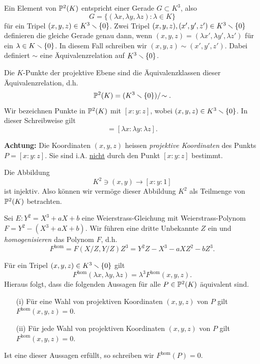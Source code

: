 \begin{bemerkung}
  Ein Element von ${\mathbb{P}}^2(K)$ entspricht einer Gerade $G\subset K^3$,
  also
  $$ G = \{ (\lambda x,\lambda y,\lambda z) : \lambda\in K\}$$
  für ein Tripel $(x,y,z)\in K^3\smallsetminus\{0\}$. Zwei Tripel
  $(x,y,z),(x',y',z')\in K^3\smallsetminus\{0\}$ definieren die gleiche Gerade
  genau dann, wenn
  $(x,y,z)=(\lambda x',\lambda y',\lambda z')$ für ein $\lambda\in
  K\smallsetminus\{0\}$.
  In diesem Fall schreiben wir $(x,y,z)\sim (x',y',z')$. Dabei
  definiert $\sim$ eine Äquivalenzrelation auf $K^3\smallsetminus\{0\}$.

  Die $K$-Punkte der projektive Ebene sind die Äquivalenzklassen dieser
  Äquivalenzrelation, d.h. 
  \begin{equation*}
    {\mathbb{P}}^2(K) = (K^3\smallsetminus\{0\})/\!\sim.
  \end{equation*}
  Wir bezeichnen Punkte in ${\mathbb{P}}^2(K)$ mit $[x:y:z]$, wobei $(x,y,z)\in
  K^3\smallsetminus\{0\}$. In dieser Schreibweise gilt
  \begin{equation*}
    [x:y:z] = [\lambda x : \lambda y : \lambda z]. 
  \end{equation*}

  \textbf{Achtung:} Die Koordinaten $(x,y,z)$ heissen \emph{projektive
    Koordinaten} des Punkts $P=[x:y:z]$. Sie sind i.A.
  \underline{nicht} durch den Punkt $[x:y:z]$ bestimmt.

  Die Abbildung
  \begin{equation}
    \label{eq:affinechart}
    K^2\ni (x,y)\rightarrow [x:y:1] 
  \end{equation}
  ist injektiv. Also
  können wir vermöge dieser Abbildung $K^2$ als Teilmenge von
  ${\mathbb{P}}^2(K)$ betrachten. 
\end{bemerkung}


Sei $E: Y^2 = X^3+aX+b$ eine Weierstrass-Gleichung mit
Weierstrass-Polynom $F = Y^2 - (X^3+aX+b)$. Wir führen eine dritte
Unbekannte $Z$ ein und \emph{homogenisieren} das Polynom $F$, d.h.
\begin{equation}
  \label{eq:homogenisierung}
  F^{\mathrm{hom}} = F(X/Z,Y/Z)Z^3 = Y^2Z - X^3 - aXZ^2 -bZ^3.
\end{equation}

Für ein Tripel $(x,y,z)\in K^3\smallsetminus\{0\}$ gilt
$$F^{\mathrm{hom}}(\lambda x,\lambda y,\lambda z)
=\lambda^3F^{\mathrm{hom}}(x,y,z).$$
Hieraus folgt, dass die folgenden Aussagen für alle $P\in {\mathbb{P}}^2(K)$
äquivalent  sind.
\begin{enumerate}
\item [(i)] Für eine Wahl von projektiven Koordinaten $(x,y,z)$ von
  $P$ gilt $  F^{\mathrm{hom}}(x,y,z) = 0$.
\item [(ii)] Für jede Wahl von projektiven Koordinaten $(x,y,z)$ von
  $P$ gilt $  F^{\mathrm{hom}}(x,y,z) = 0$.
\end{enumerate}
Ist eine dieser Aussagen erfüllt, so schreiben wir
$F^{\mathrm{hom}}(P)=0$. 

